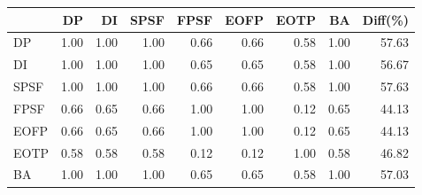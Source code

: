 \begin{tabular}{l|rrrrrrr|r}
\toprule
 & DP & DI & SPSF & FPSF & EOFP & EOTP & BA & Diff(\%)  \\
\midrule
DP & 1.00 & 1.00 & 1.00 & 0.66 & 0.66 & 0.58 & 1.00 & 57.63  \\
DI & 1.00 & 1.00 & 1.00 & 0.65 & 0.65 & 0.58 & 1.00 & 56.67  \\
SPSF & 1.00 & 1.00 & 1.00 & 0.66 & 0.66 & 0.58 & 1.00 & 57.63  \\
FPSF & 0.66 & 0.65 & 0.66 & 1.00 & 1.00 & 0.12 & 0.65 & 44.13  \\
EOFP & 0.66 & 0.65 & 0.66 & 1.00 & 1.00 & 0.12 & 0.65 & 44.13  \\
EOTP & 0.58 & 0.58 & 0.58 & 0.12 & 0.12 & 1.00 & 0.58 & 46.82  \\
BA & 1.00 & 1.00 & 1.00 & 0.65 & 0.65 & 0.58 & 1.00 & 57.03  \\
\bottomrule
\end{tabular}


